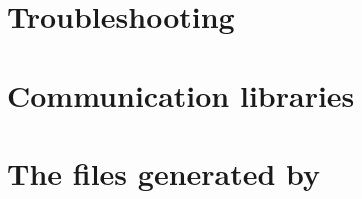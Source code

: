 \documentclass[a4paper,11pt]{book}
\begin{document}
\appendix

\chapter{Troubleshooting}
\label{anx|troubles}


\chapter{Communication libraries}
\label{anx|posters}


\chapter[The files generated by GenoM]{The files generated by \GenoM}
\label{anx|files}


\end{document}
